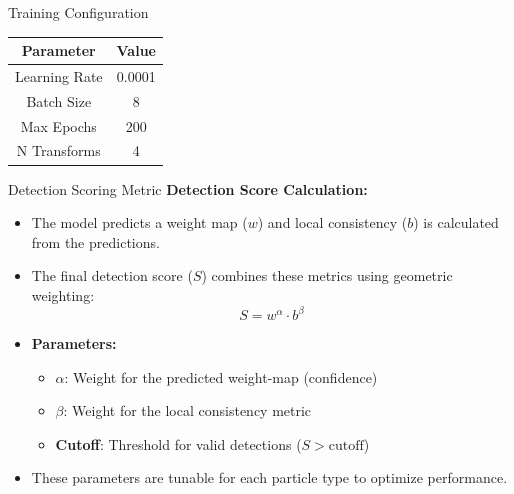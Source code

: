 \begin{frame}{Training Configuration}
\begin{center}
\begin{tabular}{|c|c|}
\hline
\textbf{Parameter} & \textbf{Value} \\
\hline
Learning Rate & 0.0001 \\
\hline
Batch Size & 8 \\
\hline
Max Epochs & 200 \\
\hline
N Transforms & 4 \\
\hline
\end{tabular}
\end{center}

\end{frame}

\begin{frame}{Detection Scoring Metric}
    \textbf{Detection Score Calculation:}
    \begin{itemize}
        \item The model predicts a weight map ($w$) and local consistency ($b$) is calculated from the predictions.
        \item The final detection score ($S$) combines these metrics using geometric weighting:
        \begin{equation*}
            S = w^\alpha \cdot b^\beta
        \end{equation*}
        \item \textbf{Parameters:}
        \begin{itemize}
            \item $\alpha$: Weight for the predicted weight-map (confidence)
            \item $\beta$: Weight for the local consistency metric
            \item \textbf{Cutoff}: Threshold for valid detections ($S > \text{cutoff}$)
        \end{itemize}
        \item These parameters are tunable for each particle type to optimize performance.
    \end{itemize}
\end{frame}

